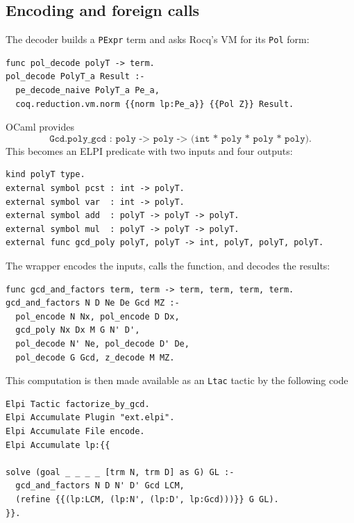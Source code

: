 \documentclass[11pt]{article}
\begin{document}
\subsection{Encoding and foreign calls}
The decoder builds a \texttt{PExpr} term and asks Rocq's VM for its
\texttt{Pol} form:
\begin{lstlisting}
func pol_decode polyT -> term.
pol_decode PolyT_a Result :-
  pe_decode_naive PolyT_a Pe_a,
  coq.reduction.vm.norm {{norm lp:Pe_a}} {{Pol Z}} Result.
\end{lstlisting}
OCaml provides
\[
  \texttt{Gcd.poly\_gcd : poly -> poly -> (int * poly * poly * poly)}.
\]
This becomes an ELPI predicate with two inputs and four outputs:
\begin{lstlisting}
kind polyT type.
external symbol pcst : int -> polyT.
external symbol var  : int -> polyT.
external symbol add  : polyT -> polyT -> polyT.
external symbol mul  : polyT -> polyT -> polyT.
external func gcd_poly polyT, polyT -> int, polyT, polyT, polyT.
\end{lstlisting}
The wrapper encodes the inputs, calls the function, and decodes the results:
\begin{lstlisting}
func gcd_and_factors term, term -> term, term, term, term.
gcd_and_factors N D Ne De Gcd MZ :-
  pol_encode N Nx, pol_encode D Dx,
  gcd_poly Nx Dx M G N' D',
  pol_decode N' Ne, pol_decode D' De,
  pol_decode G Gcd, z_decode M MZ.
\end{lstlisting}

This computation is then made available as an {\tt Ltac} tactic by the
following code 
\begin{lstlisting}
Elpi Tactic factorize_by_gcd.
Elpi Accumulate Plugin "ext.elpi".
Elpi Accumulate File encode.
Elpi Accumulate lp:{{

solve (goal _ _ _ _ [trm N, trm D] as G) GL :-
  gcd_and_factors N D N' D' Gcd LCM,
  (refine {{(lp:LCM, (lp:N', (lp:D', lp:Gcd)))}} G GL).
}}.
\end{lstlisting}
\end{document}
